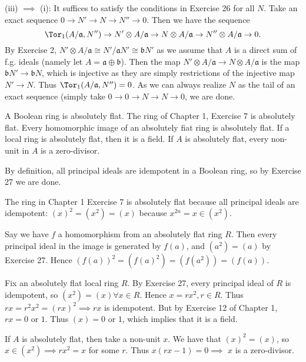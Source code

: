 \documentclass[a4paper]{exam}
\begin{document}
\begin{questions}
\begin{solution}
		(iii) $\implies $ (i):
		It suffices to satisfy the conditions in Exercise 26 for all $N $.
		Take an exact sequence $0\to N' \to N \to N'' \to 0$.
		Then we have the sequence
		\[
			\Tor_1(A / \mathfrak{a},N'') \to N' \otimes A / \mathfrak{a} \to N \otimes A / \mathfrak{a} \to N'' \otimes A / \mathfrak{a}\to 0
		.\]
		By Exercise 2, $N' \otimes A / \mathfrak{a} \cong N' / \mathfrak{a}N' \cong \mathfrak{b}N' $ as we assume that $A $ is a direct sum of f.g. ideals (namely let $A = \mathfrak{a}\oplus \mathfrak{b} $).
		Then the map $N' \otimes A / \mathfrak{a} \to N \otimes A / \mathfrak{a} $ is the map $\mathfrak{b}N' \to \mathfrak{b}N $, which is injective as they are simply restrictions of the injective map $N' \to N $.
		Thus $\Tor_1(A / \mathfrak{a}, N'') = 0 $.
		As we can always realize $N $ as the tail of an exact sequence (simply take $0\to 0 \to N \to N \to 0$, we are done.
	\end{solution}

	\question A Boolean ring is absolutely flat. The ring of Chapter 1, Exercise 7 is absolutely flat. Every homomorphic image of an absolutely fiat ring is absolutely flat. If a local ring is absolutely flat, then it is a field. If $A$ is absolutely flat, every non-unit in $A$ is a zero-divisor.
	\begin{solution}
		By definition, all principal ideals are idempotent in a Boolean ring, so by Exercise 27 we are done.

		The ring in Chapter 1 Exercise 7 is absolutely flat because all principal ideals are idempotent: $(x)^2= (x^2) = (x) $ because $x^{2n} = x \in (x^2) $.

		Say we have $f $ a homomorphism from an absolutely flat ring $R $.
		Then every principal ideal in the image is generated by $f(a) $, and $(a^2) = (a)$ by Exercise 27.
		Hence $(f(a))^2 = (f(a)^2) = (f(a^2)) = (f(a)) $.

		Fix an absolutely flat local ring $R $.
		By Exercise 27, every principal ideal of $R $ is idempotent, so $(x^2) = (x) \forall x \in R $.
		Hence $x = rx^2, r \in R $.
		Thus $rx = r^2x^2 = (rx)^2 \implies rx $ is idempotent.
		But by Exercise 12 of Chapter 1, $rx = 0 $ or $1 $.
		Thus $(x) = 0 $ or $1 $, which implies that it is a field.

		If $A $ is absolutely flat, then take a non-unit $x $.
		We have that $(x)^2 = (x) $, so $x \in (x^2) \implies rx^2 = x $ for some $r $.
		Thus $x(rx-1) = 0 \implies $ $x $ is a zero-divisor.
	\end{solution}
\end{questions}
\end{document}
